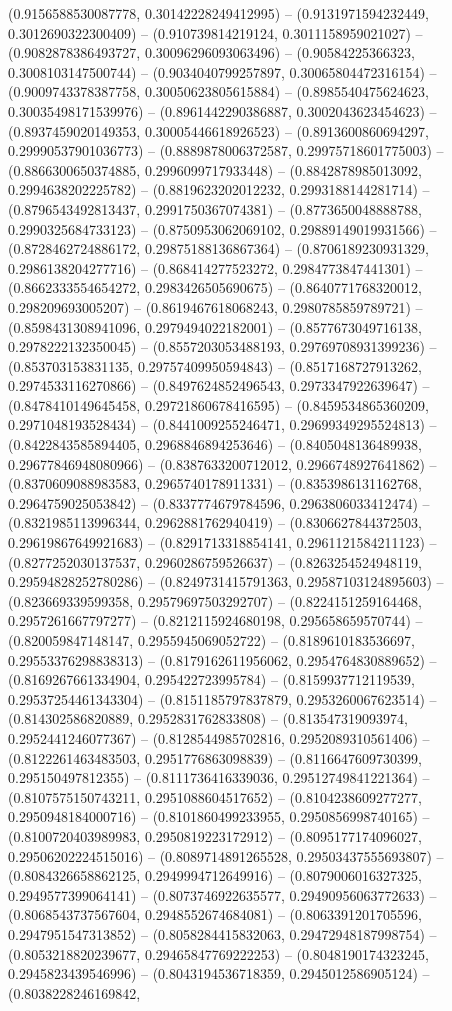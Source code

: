 (0.9156588530087778, 0.30142228249412995) -- (0.9131971594232449, 0.3012690322300409) -- (0.910739814219124, 0.3011158959021027) -- (0.9082878386493727, 0.30096296093063496) -- (0.90584225366323, 0.3008103147500744) -- (0.9034040799257897, 0.30065804472316154) -- (0.9009743378387758, 0.30050623805615884) -- (0.8985540475624623, 0.30035498171539976) -- (0.8961442290386887, 0.3002043623454623) -- (0.8937459020149353, 0.30005446618926523) -- (0.8913600860694297, 0.29990537901036773) -- (0.8889878006372587, 0.29975718601775003) -- (0.8866300650374885, 0.2996099717933448) -- (0.8842878985013092, 0.2994638202225782) -- (0.8819623202012232, 0.2993188144281714) -- (0.8796543492813437, 0.2991750367074381) -- (0.8773650048888788, 0.2990325684733123) -- (0.8750953062069102, 0.29889149019931566) -- (0.8728462724886172, 0.29875188136867364) -- (0.8706189230931329, 0.2986138204277716) -- (0.868414277523272, 0.2984773847441301) -- (0.8662333554654272, 0.2983426505690675) -- (0.8640771768320012, 0.298209693005207) -- (0.8619467618068243, 0.2980785859789721) -- (0.8598431308941096, 0.2979494022182001) -- (0.8577673049716138, 0.2978222132350045) -- (0.8557203053488193, 0.29769708931399236) -- (0.853703153831135, 0.29757409950594843) -- (0.8517168727913262, 0.2974533116270866) -- (0.8497624852496543, 0.2973347922639647) -- (0.8478410149645458, 0.29721860678416595) -- (0.8459534865360209, 0.2971048193528434) -- (0.8441009255246471, 0.29699349295524813) -- (0.8422843585894405, 0.2968846894253646) -- (0.8405048136489938, 0.29677846948080966) -- (0.8387633200712012, 0.2966748927641862) -- (0.8370609088983583, 0.2965740178911331) -- (0.8353986131162768, 0.2964759025053842) -- (0.8337774679784596, 0.2963806033412474) -- (0.8321985113996344, 0.2962881762940419) -- (0.8306627844372503, 0.29619867649921683) -- (0.8291713318854141, 0.2961121584211123) -- (0.8277252030137537, 0.2960286759526637) -- (0.8263254524948119, 0.29594828252780286) -- (0.8249731415791363, 0.29587103124895603) -- (0.823669339599358, 0.29579697503292707) -- (0.8224151259164468, 0.2957261667797277) -- (0.8212115924680198, 0.295658659570744) -- (0.820059847148147, 0.2955945069052722) -- (0.8189610183536697, 0.29553376298838313) -- (0.8179162611956062, 0.2954764830889652) -- (0.8169267661334904, 0.295422723995784) -- (0.8159937712119539, 0.29537254461343304) -- (0.8151185797837879, 0.2953260067623514) -- (0.814302586820889, 0.2952831762833808) -- (0.813547319093974, 0.2952441246077367) -- (0.8128544985702816, 0.2952089310561406) -- (0.8122261463483503, 0.2951776863098839) -- (0.8116647609730399, 0.295150497812355) -- (0.8111736416339036, 0.29512749841221364) -- (0.8107575150743211, 0.2951088604517652) -- (0.8104238609277277, 0.2950948184000716) -- (0.8101860499233955, 0.2950856998740165) -- (0.8100720403989983, 0.2950819223172912) -- (0.8095177174096027, 0.29506202224515016) -- (0.8089714891265528, 0.29503437555693807) -- (0.8084326658862125, 0.2949994712649916) -- (0.8079006016327325, 0.2949577399064141) -- (0.8073746922635577, 0.29490956063772633) -- (0.8068543737567604, 0.2948552674684081) -- (0.8063391201705596, 0.2947951547313852) -- (0.8058284415832063, 0.29472948187998754) -- (0.8053218820239677, 0.29465847769222253) -- (0.8048190174323245, 0.2945823439546996) -- (0.8043194536718359, 0.2945012586905124) -- (0.8038228246169842, 